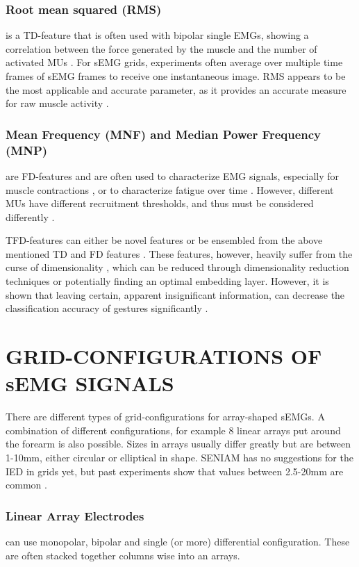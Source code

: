 \documentclass{article}
\begin{document}
\subsubsection{Root mean squared (RMS)} \cite{Kendell2012} \cite{Nazmi2016} is a TD-feature that is often used with bipolar single EMGs, showing a correlation between the force generated by the muscle and the number of activated MUs \cite{}. For sEMG grids, experiments often average over multiple time frames of sEMG frames to receive one instantaneous image. RMS appears to be the most applicable and accurate parameter, as it provides an accurate measure for raw muscle activity \cite{Nazmi2016}.
\subsubsection{Mean Frequency (MNF) and Median Power Frequency (MNP)} are FD-features and are often used to characterize EMG signals, especially for muscle contractions \cite{Merletti1997}, or to characterize fatigue over time \cite{Phinyomark2009}. However, different MUs have different recruitment thresholds, and thus must be considered differently \cite{Linnamo2002} \cite{Kossev1998} \cite{Nazmi2016}. 

TFD-features can either be novel features or be ensembled from the above mentioned TD and FD features \cite{Guo2016}. These features, however, heavily suffer from the curse of dimensionality \cite{Boccia2015}, which can be reduced through dimensionality reduction techniques \cite{Nazmi2016} or potentially finding an optimal embedding layer. However, it is shown that leaving certain, apparent insignificant information, can decrease the classification accuracy of gestures significantly \cite{Du2017}.

\section{GRID-CONFIGURATIONS OF sEMG SIGNALS \cite{Kilby2016}}
There are different types of grid-configurations for array-shaped sEMGs. A combination of different configurations, for example 8 linear arrays put around the forearm is also possible. Sizes in arrays usually differ greatly but are between 1-10mm, either circular or elliptical in shape.
SENIAM has no suggestions for the IED in grids yet, but past experiments show that values between 2.5-20mm are common \cite{Kilby2016}.

\subsubsection{Linear Array Electrodes} can use monopolar, bipolar and single (or more) differential configuration. These are often stacked together columns wise into an arrays.
\end{document}
